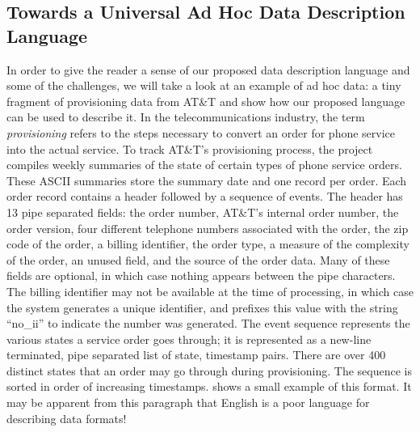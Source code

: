 \documentclass[11pt]{article}
\begin{document}



\subsection{Towards a Universal Ad Hoc Data Description Language}

In order to give the reader a sense of our proposed data
description language and some of the challenges, we
will take a look at an example of ad hoc data:
a tiny fragment of provisioning data from AT\&T and show
how our proposed \datatype{} language can be used to describe it.
In the telecommunications industry, the term \textit{provisioning} refers to 
the steps necessary to convert an order for phone service into the actual 
service.  
To track AT\&T's provisioning process, the \dibbler{} project compiles
weekly summaries of the state of certain types of phone service orders.  
These ASCII summaries store the summary date and one record per order.
Each order record contains a header followed by a sequence of events.
The header has 13 pipe separated fields: the order number, AT\&T's
internal order number, the order version, four different telephone
numbers associated with the order, the zip code of the order, a
billing identifier, the order type, a measure of the complexity of the
order, an unused field, and the source of the order data.  Many of
these fields are optional, in which case nothing appears between the
pipe characters.  The billing identifier may not be available at the
time of processing, in which case the system generates a unique
identifier, and prefixes this value with the string ``no\_ii'' to
indicate the number was generated. The event sequence represents the
various states a service order goes through; it is represented as a
new-line terminated, pipe separated list of state, timestamp pairs.
There are over 400 distinct states that an order may go through during
provisioning.  The sequence is sorted in order of increasing timestamps. 
 shows a small example of
this format.
It may be apparent from this paragraph that English is a poor
language for describing data formats!
\end{document}

